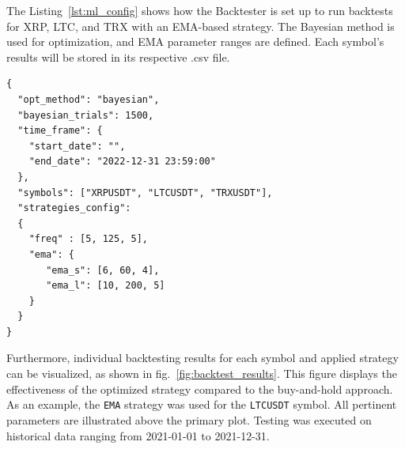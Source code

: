 The Listing~\ref{lst:ml_config} shows how the Backtester is set up to run backtests for XRP, LTC, and TRX with an EMA-based strategy.
The Bayesian method is used for optimization, and EMA parameter ranges are defined. Each symbol's results will be stored in its respective .csv file.

\begin{lstlisting}[style=jsonstyle, caption={Machine Learning Pipeline Configuration},  label=lst:ml_config]
{
  "opt_method": "bayesian",
  "bayesian_trials": 1500,
  "time_frame": {
    "start_date": "",
    "end_date": "2022-12-31 23:59:00"
  },
  "symbols": ["XRPUSDT", "LTCUSDT", "TRXUSDT"],
  "strategies_config":
  {
    "freq" : [5, 125, 5],
    "ema": {
       "ema_s": [6, 60, 4],
       "ema_l": [10, 200, 5]
    }
  }
}
\end{lstlisting}

Furthermore, individual backtesting results for each symbol and applied strategy can be visualized,
as shown in fig.~\ref{fig:backtest_results}. This figure displays the effectiveness of the optimized strategy
compared to the buy-and-hold approach. As an example, the \texttt{EMA} strategy was used for the \texttt{LTCUSDT} symbol. All pertinent parameters are
illustrated above the primary plot. Testing was executed on historical data ranging
from 2021-01-01 to 2021-12-31.


